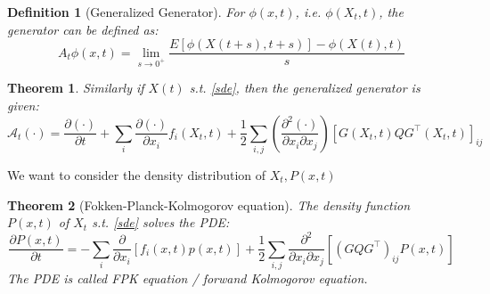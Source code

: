 \documentclass{article}
\newtheorem{theorem}{Theorem}
\newtheorem{definition}{Definition}
\begin{document}
\begin{definition}[Generalized Generator]
    For $\phi(x, t)$, i.e. $\phi(X_t, t)$, the generator can be defined as:
    \begin{equation}
        A_{t} \phi(x, t)=\lim _{s \rightarrow 0^{+}} \frac{E[\phi(X(t+s), t+s)]-\phi(X(t), t)}{s}
    \end{equation}
\end{definition}

\begin{theorem}
    Similarly if $X(t)$ s.t. \ref{sde}, then the generalized generator is given:
    \begin{equation}
        \mathcal{A}_{t}(\cdot)=\frac{\partial(\cdot)}{\partial t}+\sum_{i} \frac{\partial(\cdot)}{\partial x_{i}} f_{i}(X_t, t)+\frac{1}{2} \sum_{i, j}\left(\frac{\partial^{2}(\cdot)}{\partial x_{i} \partial x_{j}}\right)\left[G(X_t, t) Q G^{\top}(X_t, t)\right]_{i j}
    \end{equation}
\end{theorem}
We want to consider the density distribution of $X_t, P(x, t)$
\begin{theorem}[Fokken-Planck-Kolmogorov equation]
    The density function $P(x, t)$ of $X_t$ s.t. \ref{sde} solves the PDE:
    \begin{equation}
        \frac{\partial P(x, t)}{\partial t}=-\sum_{i} \frac{\partial}{\partial x_{i}}\left[f_{i}(x, t) p(x, t)\right]+\frac{1}{2} \sum_{i, j} \frac{\partial^{2}}{\partial x_{i} \partial x_{j}}\left[\left(G Q G^{\top}\right)_{i j} P(x, t)\right]
    \end{equation}
    The PDE is called FPK equation / forwand Kolmogorov equation.
\end{theorem}
\end{document}
